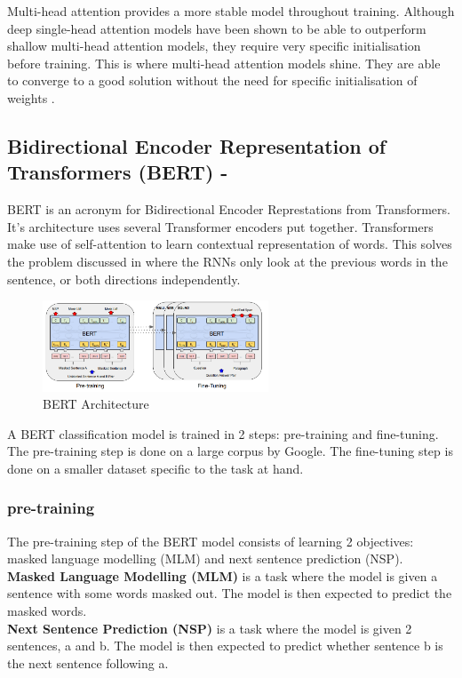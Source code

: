 Multi-head attention provides a more stable model throughout training. Although deep single-head attention models have been shown
to be able to outperform shallow multi-head attention models, they require very specific initialisation before training. This is where
multi-head attention models shine. They are able to converge to a good solution without the need for specific initialisation of weights \cite{multi-head-pros}.
\subsection{Bidirectional Encoder Representation of Transformers (BERT) - \cite{bert}}
BERT is an acronym for Bidirectional Encoder Represtations from Transformers. It's architecture uses several Transformer encoders
put together. Transformers make use of self-attention to learn contextual representation of words. This solves the problem
discussed in  where the RNNs only look at the previous words in the sentence, or both directions independently.
\begin{figure}[hbtp]
    \centering
    \includegraphics[width=0.6\textwidth]{../images/bert.png}
    \caption{BERT Architecture}
    \label{fig:bert}
\end{figure}

A BERT classification model is trained in 2 steps: pre-training and fine-tuning. The pre-training step is done on a large corpus
by Google. The fine-tuning step is done on a smaller dataset specific to the task at hand.

\subsubsection{pre-training}
The pre-training step of the BERT model consists of learning 2 objectives: masked language modelling (MLM) and next sentence prediction
(NSP).\\
\textbf{Masked Language Modelling (MLM)} is a task where the model is given a sentence with some words masked out. The model is then
expected to predict the masked words.\\
\textbf{Next Sentence Prediction (NSP)} is a task where the model is given 2 sentences, a and b. The model is then expected to predict
whether sentence b is the next sentence following a.\\\\

